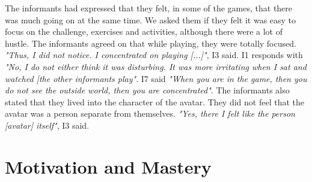 The informants had expressed that they felt, in some of the games, that there was much going on at the same time. We asked them if they felt it was easy to focus on the challenge, exercises and activities, although there were a lot of hustle. The informants agreed on that while playing, they were totally focused. \emph{"Thus, I did not notice. I concentrated on playing [...]"}, I3 said. I1 responds with \emph{"No, I do not either think it was disturbing. It was more irritating when I sat and watched [the other informants play"}. I7 said \emph{"When you are in the game, then you do not see the outside world, then you are concentrated"}. The informants also stated that they lived into the character of the avatar. They did not feel that the avatar was a person separate from themselves. \emph{"Yes, there I felt like the person [avatar] itself"}, I3 said.    


\section{Motivation and Mastery}
